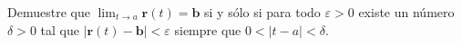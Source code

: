 \item Demuestre que $\lim_{t \to a} \mathbf{r}(t) = \mathbf{b}$ si y sólo si para todo $\varepsilon > 0$ existe un número $\delta > 0$ tal que $|\mathbf{r}(t) - \mathbf{b}| < \varepsilon$ siempre que $0 < |t - a| < \delta$.
